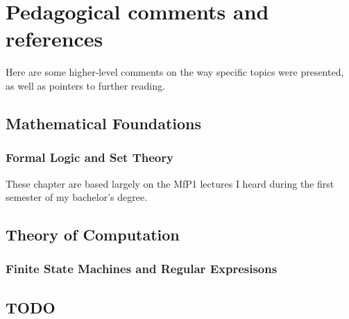 \chapter{Pedagogical comments and references}\label{ch:refs}
Here are some higher-level comments on the way specific topics were presented,
as well as pointers to further reading.

\section{Mathematical Foundations}
\subsection{Formal Logic and Set Theory}

These chapter are based largely on the MfP1\cite{ref:mfp1} lectures I heard
during the first semester of my bachelor's degree.

\section{Theory of Computation}
\subsection{Finite State Machines and Regular Expresisons}

\section{TODO}
